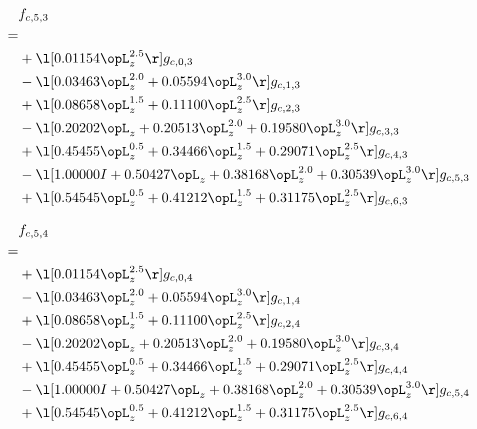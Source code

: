 \begin{alignat}{2} 
\label{eq:f_53_0} 
& f_{c,5,3} \nonumber \\ 
 = \\ 
& + \l[  0.01154 \opL_z^{2.5}  \r] g_{c,0,3} \nonumber \\ 
& - \l[  0.03463 \opL_z^{2.0} +  0.05594 \opL_z^{3.0}  \r] g_{c,1,3} \nonumber \\ 
& + \l[  0.08658 \opL_z^{1.5} +  0.11100 \opL_z^{2.5}  \r] g_{c,2,3} \nonumber \\ 
& - \l[  0.20202 \opL_z +  0.20513 \opL_z^{2.0} +  0.19580 \opL_z^{3.0}  \r] g_{c,3,3} \nonumber \\ 
& + \l[  0.45455 \opL_z^{0.5} +  0.34466 \opL_z^{1.5} +  0.29071 \opL_z^{2.5}  \r] g_{c,4,3} \nonumber \\ 
& - \l[  1.00000 I +  0.50427 \opL_z +  0.38168 \opL_z^{2.0} +  0.30539 \opL_z^{3.0}  \r] g_{c,5,3} \nonumber \\ 
& + \l[  0.54545 \opL_z^{0.5} +  0.41212 \opL_z^{1.5} +  0.31175 \opL_z^{2.5}  \r] g_{c,6,3} \nonumber \\ 
\end{alignat} 


\begin{alignat}{2} 
\label{eq:f_54_0} 
& f_{c,5,4} \nonumber \\ 
 = \\ 
& + \l[  0.01154 \opL_z^{2.5}  \r] g_{c,0,4} \nonumber \\ 
& - \l[  0.03463 \opL_z^{2.0} +  0.05594 \opL_z^{3.0}  \r] g_{c,1,4} \nonumber \\ 
& + \l[  0.08658 \opL_z^{1.5} +  0.11100 \opL_z^{2.5}  \r] g_{c,2,4} \nonumber \\ 
& - \l[  0.20202 \opL_z +  0.20513 \opL_z^{2.0} +  0.19580 \opL_z^{3.0}  \r] g_{c,3,4} \nonumber \\ 
& + \l[  0.45455 \opL_z^{0.5} +  0.34466 \opL_z^{1.5} +  0.29071 \opL_z^{2.5}  \r] g_{c,4,4} \nonumber \\ 
& - \l[  1.00000 I +  0.50427 \opL_z +  0.38168 \opL_z^{2.0} +  0.30539 \opL_z^{3.0}  \r] g_{c,5,4} \nonumber \\ 
& + \l[  0.54545 \opL_z^{0.5} +  0.41212 \opL_z^{1.5} +  0.31175 \opL_z^{2.5}  \r] g_{c,6,4} \nonumber \\ 
\end{alignat} 


